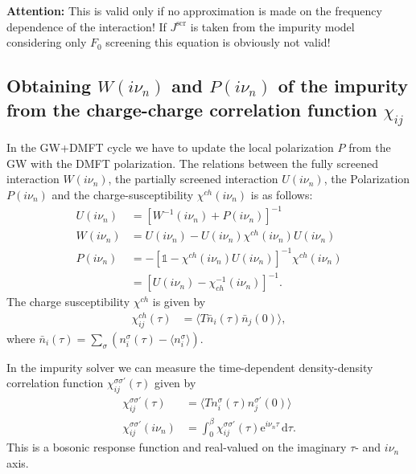 \documentclass[12pt,a4paper]{scrartcl}
\numberwithin{equation}{section}
\newcommand{\unity}{\mathds{1}}
\begin{document}
\textbf{Attention:} This is valid only if no approximation is made on the frequency dependence
of the interaction! If $J^{\mathrm{scr}}$ is taken from the impurity model
considering only $F_0$ screening this equation is obviously not valid!

\subsection{Obtaining $W(i\nu_n)$ and $P(i\nu_n)$ of the impurity from 
the charge-charge correlation function  $\chi_{ij}$}
In the GW+DMFT cycle we have to update the local polarization $P$
from the GW with the DMFT polarization.
The relations between the fully screened interaction $W(i\nu_n)$, the partially
screened interaction $U(i\nu_n)$, the Polarization $P(i\nu_n)$ and the charge-susceptibility
$\chi^{ch}(i\nu_n)$ is as follows:
\begin{align}
 U(i\nu_n) &= \left[  W^{-1}(i\nu_n) + P(i\nu_n)  \right]^{-1} \\
 W(i\nu_n) &= U(i\nu_n) -U(i\nu_n) \chi^{ch}(i\nu_n)U(i\nu_n)  \\
 P(i\nu_n) &= -\left[ \unity - \chi^{ch}(i\nu_n)U(i\nu_n) \right]^{-1} \chi^{ch}(i\nu_n) \\
           &= \left[ U(i\nu_n) - \chi^{-1}_{ch}(i\nu_n) \right]^{-1}.
\end{align}
The charge susceptibility $\chi^{ch}$ is given by
\begin{align}
 \chi^{ch}_{ij}(\tau) 
 &= \langle T \bar{n}_i(\tau) \bar{n}_j(0) \rangle ,
\end{align}
where $\bar{n}_i(\tau) = \sum_{\sigma} \left( n^{\sigma}_i(\tau) - \langle n^{\sigma}_i\rangle \right)$.

In the impurity solver we can measure the time-dependent density-density
correlation function $\chi_{ij}^{\sigma\sigma'}(\tau)$ given by
\begin{align}
 \chi_{ij}^{\sigma\sigma'}(\tau) 
 &= \langle T n_i^{\sigma}(\tau) n_j^{\sigma'}(0) \rangle \\
 \chi_{ij}^{\sigma\sigma'}(i\nu_n) 
 &= \int_0^{\beta} \chi_{ij}^{\sigma\sigma'}(\tau) \mathrm{e}^{i\nu_n\tau} \,\mathrm{d}\tau.
\end{align}
This is a bosonic response function and real-valued on the imaginary $\tau$- and $i\nu_n$ axis.
\end{document}

